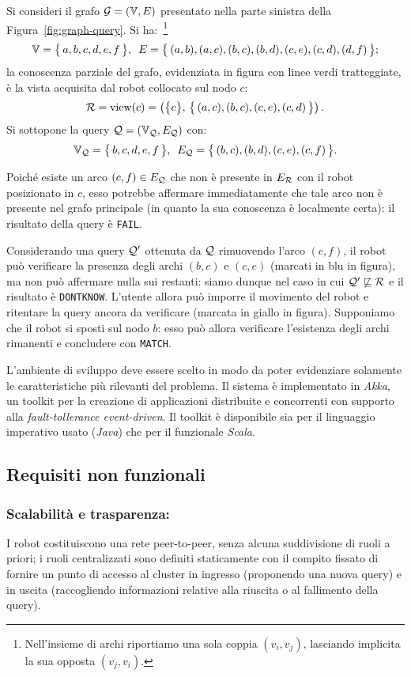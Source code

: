 \begin{example}
Si consideri il grafo $\mathcal{G} = (\mathbb{V}, E)$ presentato nella parte sinistra
della Figura~\ref{fig:graph-query}. Si ha:~\footnote{Nell'insieme di archi
riportiamo una sola coppia $(v_i, v_j)$, lasciando implicita la sua
opposta $(v_j, v_i)$.}
\[
\mathbb{V} = \bigl\{\,a, b, c, d, e, f\,\bigr\}, \ \,
E = \bigl\{\,(a,b),(a,c),(b,c),(b,d),(c,e),(c,d),(d,f)\,\bigr\};
\]
la conoscenza parziale del grafo,
evidenziata in figura con linee verdi tratteggiate,
è la vista acquisita dal robot collocato
sul nodo $c$: \[
\mathcal{R} = \mathrm{view}(c) = \left(\bigl\{c\bigr\},\,
\bigl\{\,(a,c), (b,c), (c,e), (c,d)\,\bigr\}\right). \]
Si sottopone la query $\mathcal{Q} = (\mathbb{V}_{\mathcal{Q}}, E_{\mathcal{Q}})$ con:\[
\mathbb{V}_{\mathcal{Q}} = \bigl\{\,b, c, d, e, f\,\bigr\}, \ \,
E_{\mathcal{Q}} = \bigl\{\,(b,c),(b,d),(c,e),(c,f)\,\bigr\}. \]

Poiché esiste un arco $(c,f) \in E_{\mathcal{Q}}$ che non è presente in $E_{\mathcal{R}}$
con il robot posizionato in $c$, esso potrebbe affermare immediatamente
che tale arco non è presente nel grafo principale
(in quanto la sua conoscenza è localmente certa): il risultato della query
è \texttt{FAIL}.

Considerando una query $\mathcal{Q}'$ ottenuta da $\mathcal{Q}$ rimuovendo l'arco
$(c, f)$, il robot può verificare la presenza degli archi $(b,c)$ e $(c,e)$
(marcati in blu in figura), ma non può affermare nulla sui restanti:
siamo dunque nel caso in cui $\mathcal{Q}' \not\sqsubseteq \mathcal{R}$ e il risultato
è \texttt{DONTKNOW}.
L'utente allora può imporre il movimento del robot e ritentare
la query ancora da verificare (marcata in giallo in figura).
Supponiamo che il robot si sposti sul nodo $b$: esso può allora verificare
l'esistenza degli archi rimanenti e concludere con \texttt{MATCH}.
\end{example}

L'ambiente di sviluppo deve essere scelto in modo da poter
evidenziare solamente le caratteristiche più rilevanti del problema.
Il sistema è implementato in \emph{Akka}, un toolkit per
la creazione di applicazioni distribuite e concorrenti con supporto
alla \emph{fault-tollerance event-driven}.
Il toolkit è disponibile sia per il linguaggio imperativo usato (\emph{Java})
che per il funzionale \emph{Scala}.

\subsection{Requisiti non funzionali}
\label{sec:nonfunc-req}

\subsubsection*{Scalabilità e trasparenza:}
I robot costituiscono una rete peer-to-peer,
senza alcuna suddivisione di ruoli a priori; i ruoli centralizzati
sono definiti staticamente con il compito fissato di fornire un punto
di accesso al cluster in ingresso (proponendo una nuova query) e
in uscita (raccogliendo informazioni relative alla riuscita
o al fallimento della query).

